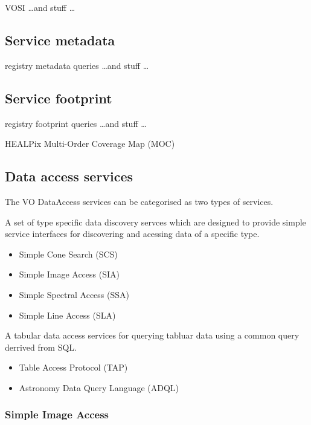 \documentclass{article}
\begin{document}
VOSI \ldots and stuff \ldots

\subsection{Service metadata}

registry metadata queries \ldots and stuff \ldots

\subsection{Service footprint}

registry footprint queries \ldots and stuff \ldots

HEALPix Multi-Order Coverage Map (MOC)

\subsection{Data access services}

The VO DataAccess services can be categorised as two types of services.

A set of type specific data discovery servces which are designed to provide
simple service interfaces for discovering and acessing data of a specific type.

\begin{itemize}
  \item Simple Cone Search (SCS)
  \item Simple Image Access (SIA)
  \item Simple Spectral Access (SSA)
  \item Simple Line Access (SLA)
\end{itemize}

A tabular data access services for querying tabluar data using a common query
derrived from SQL.

\begin{itemize}
  \item Table Access Protocol (TAP)
  \item Astronomy Data Query Language (ADQL)
\end{itemize}

\subsubsection{Simple Image Access}
\end{document}
